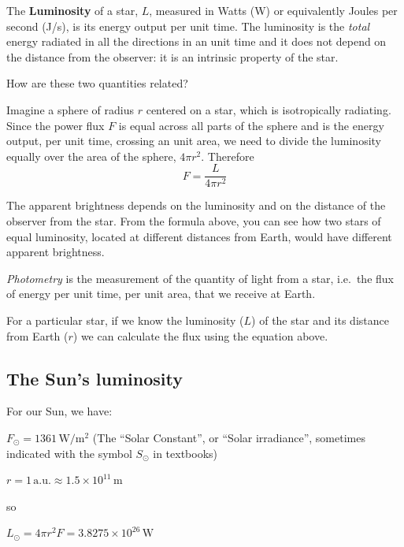 \documentclass[
  letterpaper,
  DIV=11,
  numbers=noendperiod]{scrreprt}
\begin{document}
The \textbf{Luminosity} of a star, \(L\), measured in Watts (W) or
equivalently Joules per second (J/s), is its energy output per unit
time. The luminosity is the \emph{total} energy radiated in all the
directions in an unit time and it does not depend on the distance from
the observer: it is an intrinsic property of the star.

How are these two quantities related?

Imagine a sphere of radius \(r\) centered on a star, which is
isotropically radiating. Since the power flux \(F\) is equal across all
parts of the sphere and is the energy output, per unit time, crossing an
unit area, we need to divide the luminosity equally over the area of the
sphere, \(4\pi r^2\). Therefore \begin{equation}
F = \frac{L}{4\pi r^2}
\end{equation}

The apparent brightness depends on the luminosity and on the distance of
the observer from the star. From the formula above, you can see how two
stars of equal luminosity, located at different distances from Earth,
would have different apparent brightness.

\emph{Photometry} is the measurement of the quantity of light from a
star, i.e.~the flux of energy per unit time, per unit area, that we
receive at Earth.

For a particular star, if we know the luminosity (\(L\)) of the star and
its distance from Earth (\(r\)) we can calculate the flux using the
equation above.

\hypertarget{the-suns-luminosity}{%
\subsection{The Sun's luminosity}\label{the-suns-luminosity}}

For our Sun, we have:

\(F_\odot = 1361\, \mathrm{W/m^2}\) (The ``Solar Constant'', or ``Solar
irradiance'', sometimes indicated with the symbol \(S_\odot\) in
textbooks)

\(r = 1\, \mathrm{a.u.} \approx 1.5\times 10^{11}\, \mathrm{m}\)

so

\(L_\odot = 4\pi r^2 F = 3.8275 \times 10^{26}\, \mathrm{W}\)
\end{document}
